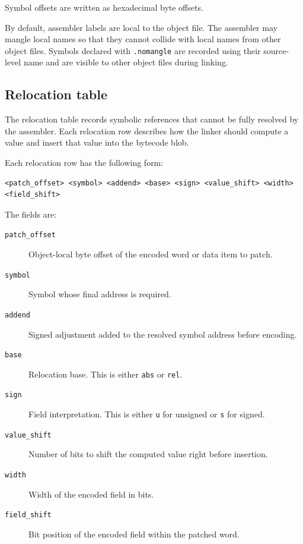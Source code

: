 Symbol offsets are written as hexadecimal byte offsets.

By default, assembler labels are local to the object file. The assembler may mangle
local names so that they cannot collide with local names from other object files.
Symbols declared with \texttt{.nomangle} are recorded using their source-level name and
are visible to other object files during linking.

\subsection{Relocation table}

The relocation table records symbolic references that cannot be fully resolved by the
assembler. Each relocation row describes how the linker should compute a value and
insert that value into the bytecode blob.

Each relocation row has the following form:

\begin{verbatim}
<patch_offset> <symbol> <addend> <base> <sign> <value_shift> <width> <field_shift>
\end{verbatim}

The fields are:

\begin{description}
    \item[\texttt{patch\_offset}] Object-local byte offset of the encoded word or data
    item to patch.

    \item[\texttt{symbol}] Symbol whose final address is required.

    \item[\texttt{addend}] Signed adjustment added to the resolved symbol address before
    encoding.

    \item[\texttt{base}] Relocation base. This is either \texttt{abs} or \texttt{rel}.

    \item[\texttt{sign}] Field interpretation. This is either \texttt{u} for unsigned
    or \texttt{s} for signed.

    \item[\texttt{value\_shift}] Number of bits to shift the computed value right before
    insertion.

    \item[\texttt{width}] Width of the encoded field in bits.

    \item[\texttt{field\_shift}] Bit position of the encoded field within the patched
    word.
\end{description}

